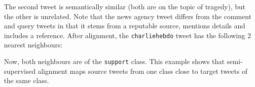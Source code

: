 \documentclass[letterpaper]{article} %
\begin{document}
\vspace{5px}
\noindent {}
\vspace{5px}
\noindent {}

%

\noindent The second tweet is semantically similar (both are on the topic of tragedy), but the other is unrelated. Note that the news agency tweet differs from the comment and query tweets in that it stems from a reputable source, mentions details and includes a reference. After alignment, the \texttt{charliehebdo} tweet has the following 2 nearest neighbours:

\vspace{5px}
\noindent {}
\vspace{5px}
\noindent {}
Now, both neighbours are of the \texttt{support} class. This example shows that semi-supervised alignment maps source tweets from one class close to target tweets of the same class. 
\end{document}

